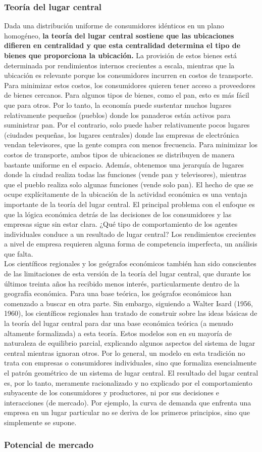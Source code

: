 \subsubsection{Teoría del lugar central}
Dada una distribución uniforme de consumidores idénticos en un plano homogéneo, \textbf{la teoría del lugar central sostiene que las ubicaciones difieren en centralidad y que esta centralidad determina el tipo de bienes que proporciona la ubicación.} La provisión de estos bienes está determinada por rendimientos internos crecientes a escala, mientras que la ubicación es relevante porque los consumidores incurren en costos de transporte. Para minimizar estos costos, los consumidores quieren tener acceso a proveedores de bienes cercanos. Para algunos tipos de bienes, como el pan, esto es más fácil que para otros. Por lo tanto, la economía puede sustentar muchos lugares relativamente pequeños (pueblos) donde los panaderos están activos para suministrar pan. Por el contrario, solo puede haber relativamente pocos lugares (ciudades pequeñas, los lugares centrales) donde las empresas de electrónica vendan televisores, que la gente compra con menos frecuencia. Para minimizar los costos de transporte, ambos tipos de ubicaciones se distribuyen de manera bastante uniforme en el espacio. Además, obtenemos una jerarquía de lugares donde la ciudad realiza todas las funciones (vende pan y televisores), mientras que el pueblo realiza solo algunas funciones (vende solo pan). 
El hecho de que se ocupe explícitamente de la ubicación de la actividad económica es una ventaja importante de la teoría del lugar central. El principal problema con el enfoque es que la lógica económica detrás de las decisiones de los consumidores y las empresas sigue sin estar clara. ¿Qué tipo de comportamiento de los agentes individuales conduce a un resultado de lugar central? Los rendimientos crecientes a nivel de empresa requieren alguna forma de competencia imperfecta, un análisis que falta. \\
Los científicos regionales y los geógrafos económicos también han sido conscientes de las limitaciones de esta versión de la teoría del lugar central, que durante los últimos treinta años ha recibido menos interés, particularmente dentro de la geografía económica. Para una base teórica, los geógrafos económicos han comenzado a buscar en otra parte. Sin embargo, siguiendo a Walter Isard (1956, 1960), los científicos regionales han tratado de construir sobre las ideas básicas de la teoría del lugar central para dar una base económica teórica (a menudo altamente formalizada) a esta teoría. Estos modelos son en su mayoría de naturaleza de equilibrio parcial, explicando algunos aspectos del sistema de lugar central mientras ignoran otros. Por lo general, un modelo en esta tradición no trata con empresas o consumidores individuales, sino que formaliza esencialmente el patrón geométrico de un sistema de lugar central. El resultado del lugar central es, por lo tanto, meramente racionalizado y no explicado por el comportamiento subyacente de los consumidores y productores, ni por sus decisiones e interacciones (de mercado). Por ejemplo, la curva de demanda que enfrenta una empresa en un lugar particular no se deriva de los primeros principios, sino que simplemente se supone. 

\subsubsection{Potencial de mercado}
